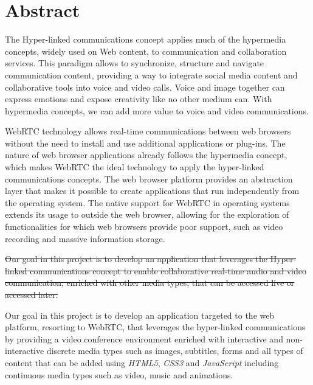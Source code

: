 \chapter*{Abstract}


The Hyper-linked communications concept applies much of the hypermedia concepts, widely used on Web content, to communication and collaboration services. This paradigm allows to synchronize, structure and navigate communication content, providing a way to integrate social media content and collaborative tools into voice and video calls.
Voice and image together can express emotions and expose creativity like no other medium can. With hypermedia concepts, we can add more value to voice and video communications.

\ac{WebRTC} technology allows real-time communications between web browsers without the need to install and use additional applications or plug-ins. The nature of web browser applications already follows the hypermedia concept, which makes \ac{WebRTC} the ideal technology to apply the hyper-linked communications concepts.
{\color{blue}The web browser platform provides an abstraction layer that makes it possible to create applications that run independently from the operating system.}
The native support for \ac{WebRTC} in operating systems extends its usage to outside the web browser, allowing for the exploration of functionalities for which web browsers provide poor support, such as video recording and massive information storage.

\sout{Our goal in this project is to develop an application that leverages the Hyper-linked communications concept to enable collaborative real-time audio and video communication, enriched with other media types, that can be accessed live or accessed later.}


{\color{red}Our goal in this project is to develop an application targeted to the web platform, resorting to \ac{WebRTC}, that leverages the hyper-linked communications by providing a video conference environment enriched with interactive and non-interactive discrete media types such as images, subtitles, forms and all types of content that can be added using \emph{HTML5}, \emph{CSS3} and \emph{JavaScript} including continuous media types such as video, music and animations.}

